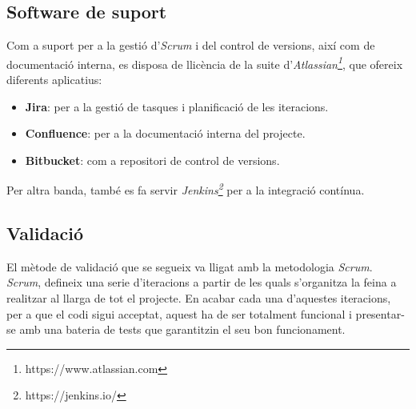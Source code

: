 \subsection{Software de suport}
Com a suport per a la gestió d'\textit{Scrum} i del control de versions, així com de documentació interna, es disposa de llicència de la suite d'\textit{Atlassian\footnote{https://www.atlassian.com}}, que ofereix diferents aplicatius:
\begin{itemize}
	\item \textbf{Jira}: per a la gestió de tasques i planificació de les iteracions.
	\item \textbf{Confluence}: per a la documentació interna del projecte.
	\item \textbf{Bitbucket}: com a repositori de control de versions.
\end{itemize}
Per altra banda, també es fa servir \textit{Jenkins\footnote{https://jenkins.io/}} per a la integració contínua.

\subsection{Validació}
El mètode de validació que se segueix va lligat amb la metodologia \textit{Scrum}.\\
\textit{Scrum}, defineix una serie d'iteracions a partir de les quals s'organitza la feina a realitzar al llarga de tot el projecte. En acabar cada una d'aquestes iteracions, per a que el codi sigui acceptat,  aquest ha de ser totalment funcional i presentar-se amb una bateria de tests que garantitzin el seu bon funcionament.

















